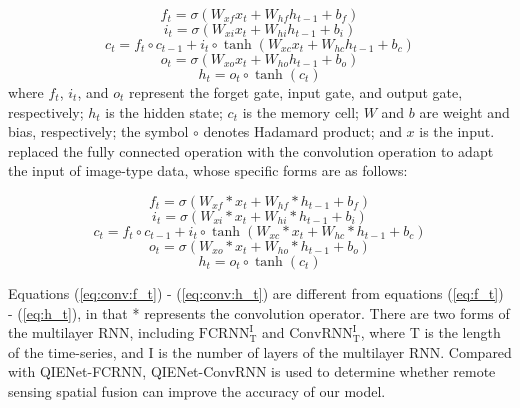 \documentclass[review]{elsarticle}
\begin{document}
\begin{equation}
    \label{eq:f_t}
    f_{t} = \sigma (W_{xf} x_{t} + W_{hf} h_{t-1} + b_{f})
\end{equation}
\begin{equation}
    \label{eq:i_t}
    i_{t} = \sigma (W_{xi} x_{t} + W_{hi} h_{t-1} + b_{i})
\end{equation}
\begin{equation}
    \label{eq:c_t}
    c_{t} = f_{t} \circ c_{t-1} + i_{t} \circ \tanh (W_{xc} x_{t} + W_{hc} h_{t-1} + b_{c})
\end{equation}
\begin{equation}
    \label{eq:o_t}
    o_{t} = \sigma (W_{xo} x_{t} + W_{ho} h_{t-1} + b_{o})
\end{equation}
\begin{equation}
    \label{eq:h_t}
    h_{t} = o_{t} \circ \tanh(c_{t})
\end{equation}
where $f_{t}$, $i_{t}$, and $o_{t}$ represent the forget gate, input gate, and output gate, respectively; $h_{t}$ is the hidden state; $c_{t}$ is the memory cell; $W$ and $b$ are weight and bias, respectively; the symbol $\circ$ denotes Hadamard product; and $x$ is the input. \citet{shi2015convLSTM} replaced the fully connected operation with the convolution operation to adapt the input of image-type data, whose specific forms are as follows:

\begin{equation}
    \label{eq:conv:f_t}
    f_{t} = \sigma (W_{xf} * x_{t} + W_{hf} * h_{t-1} + b_{f})
\end{equation}
\begin{equation}
    \label{eq:conv:i_t}
    i_{t} = \sigma (W_{xi} * x_{t} + W_{hi} * h_{t-1} + b_{i})
\end{equation}
\begin{equation}
    \label{eq:conv:c_t}
    c_{t} = f_{t} \circ c_{t-1} + i_{t} \circ \tanh (W_{xc} * x_{t} + W_{hc} * h_{t-1} + b_{c})
\end{equation}
\begin{equation}
    \label{eq:conv:o_t}
    o_{t} = \sigma (W_{xo} * x_{t} + W_{ho} * h_{t-1} + b_{o})
\end{equation}
\begin{equation}
    \label{eq:conv:h_t}
    h_{t} = o_{t} \circ \tanh(c_{t})
\end{equation}

Equations (\ref{eq:conv:f_t}) - (\ref{eq:conv:h_t}) are different from equations (\ref{eq:f_t}) - (\ref{eq:h_t}), in that * represents the convolution operator. There are two forms of the multilayer RNN, including $\mathrm{FCRNN_{T}^{I}}$ and $\mathrm{ConvRNN_{T}^{I}}$, where T is the length of the time-series, and I is the number of layers of the multilayer RNN. Compared with QIENet-FCRNN, QIENet-ConvRNN is used to determine whether remote sensing spatial fusion can improve the accuracy of our model.
\end{document}
